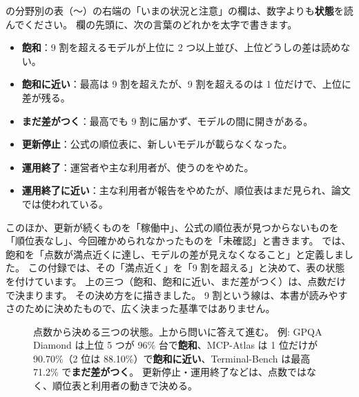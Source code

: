 の分野別の表（〜）の右端の「いまの状況と注意」の欄は、数字よりも\textbf{状態}を読んでください。
欄の先頭に、次の言葉のどれかを太字で書きます。
\begin{itemize}[nosep]
  \item \textbf{飽和}：9 割を超えるモデルが上位に 2 つ以上並び、上位どうしの差は読めない。
  \item \textbf{飽和に近い}：最高は 9 割を超えたが、9 割を超えるのは 1 位だけで、上位に差が残る。
  \item \textbf{まだ差がつく}：最高でも 9 割に届かず、モデルの間に開きがある。
  \item \textbf{更新停止}：公式の順位表に、新しいモデルが載らなくなった。
  \item \textbf{運用終了}：運営者や主な利用者が、使うのをやめた。
  \item \textbf{運用終了に近い}：主な利用者が報告をやめたが、順位表はまだ見られ、論文では使われている。
\end{itemize}
このほか、更新が続くものを「稼働中」、公式の順位表が見つからないものを「順位表なし」、今回確かめられなかったものを「未確認」と書きます。
では、飽和を「点数が満点近くに達し、モデルの差が見えなくなること」と定義しました。
この付録では、その「満点近く」を「9 割を超える」と決めて、表の状態を付けています。
上の三つ（飽和、飽和に近い、まだ差がつく）は、点数だけで決まります。
その決め方をに描きました。
9 割という線は、本書が読みやすさのために決めたもので、広く決まった基準ではありません。

\begin{figure}[htbp]
\centering
{}
\caption{点数から決める三つの状態。上から問いに答えて進む。
例: GPQA Diamond は上位 5 つが 96\% 台で\textbf{飽和}、MCP-Atlas は 1 位だけが 90.70\%（2 位は 88.10\%）で\textbf{飽和に近い}、Terminal-Bench は最高 71.2\% で\textbf{まだ差がつく}。
更新停止・運用終了などは、点数ではなく、順位表と利用者の動きで決める。}
\label{fig:bm-status}
\end{figure}

